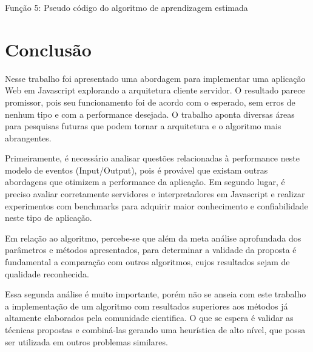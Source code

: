 \documentclass[dm,ppgcomp]{texfurg}
\begin{document}
Função 5: Pseudo código do algoritmo de aprendizagem estimada

\chapter{Conclusão}

Nesse trabalho foi apresentado uma abordagem para implementar uma aplicação Web
em Javascript explorando a arquitetura cliente servidor. O resultado parece promissor, pois
seu funcionamento foi de acordo com o esperado, sem erros de nenhum tipo e com a
performance desejada. O trabalho aponta diversas áreas para pesquisas futuras que podem
tornar a arquitetura e o algoritmo mais abrangentes. 

Primeiramente, é necessário analisar questões relacionadas à performance neste modelo
de eventos (Input/Output), pois é provável que existam outras abordagens que otimizem a
performance da aplicação. Em segundo lugar, é preciso avaliar corretamente servidores e
interpretadores em Javascript e realizar experimentos com benchmarks para adquirir maior
conhecimento e confiabilidade neste tipo de aplicação.

Em relação ao algoritmo, percebe-se que além da meta análise aprofundada dos
parâmetros e métodos apresentados, para determinar a validade da proposta é fundamental a
comparação com outros algoritmos, cujos resultados sejam de qualidade reconhecida. 

Essa segunda análise é muito importante, porém não se anseia com este trabalho a
implementação de um algoritmo com resultados superiores aos métodos já altamente
elaborados pela comunidade cientifica. O que se espera é validar as técnicas propostas e
combiná-las gerando uma heurística de alto nível, que possa ser utilizada em outros
problemas similares.



\end{document}
